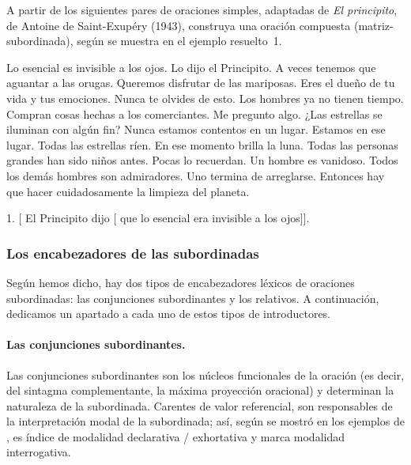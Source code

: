 \begin{ejercicio}\label{ej:13-principito}
A partir de los siguientes pares de oraciones simples, adaptadas de \textit{El
principito}, de Antoine de Saint-Exupéry (1943), construya una oración compuesta
(matriz-subordinada), según se muestra en el ejemplo resuelto~1.

\begin{exe}
  \ex Lo esencial es invisible a los ojos. Lo dijo el Principito.
  \ex A veces tenemos que aguantar a las orugas. Queremos disfrutar de las
      mariposas.
  \ex Eres el dueño de tu vida y tus emociones. Nunca te olvides de esto.
  \ex Los hombres ya no tienen tiempo. Compran cosas hechas a los comerciantes.
  \ex Me pregunto algo. ¿Las estrellas se iluminan con algún fin?
  \ex Nunca estamos contentos en un lugar. Estamos en ese lugar.
  \ex Todas las estrellas ríen. En ese momento brilla la luna.
  \ex Todas las personas grandes han sido niños antes. Pocas lo recuerdan.
  \ex Un hombre es vanidoso. Todos los demás hombres son admiradores.
  \ex Uno termina de arreglarse. Entonces hay que hacer cuidadosamente la
      limpieza del planeta.
\end{exe}

\begin{resuelto}
1. [ El Principito dijo [ que lo esencial era invisible a los
ojos]].
\end{resuelto}
\end{ejercicio}

\subsubsection{Los encabezadores de las subordinadas}\label{sec:13-encabezadores}

Según hemos dicho, hay dos tipos de encabezadores léxicos de oraciones
subordinadas: las conjunciones subordinantes y los relativos. A continuación,
dedicamos un apartado a cada uno de estos tipos de introductores.

\paragraph{Las conjunciones subordinantes.}\label{sec:13-conjunciones}
Las conjunciones subordinantes son los núcleos funcionales de la oración (es
decir, del sintagma complementante, la máxima proyección oracional) y determinan
la naturaleza de la subordinada. Carentes de valor referencial, son responsables
de la interpretación modal de la subordinada; así, según se mostró en los
ejemplos de ,  es índice de modalidad
declarativa / exhortativa y  marca modalidad interrogativa.


